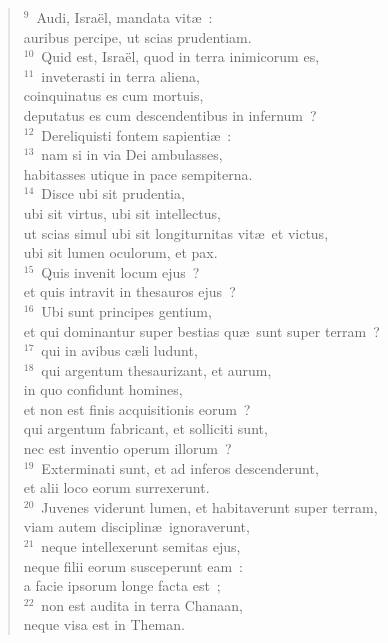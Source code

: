 \begin{verse}${}^{9}$~Audi, Isra\"el, mandata vit\ae~:\\ auribus percipe, ut scias prudentiam.\\
${}^{10}$~Quid est, Isra\"el, quod in terra inimicorum es,\\
${}^{11}$~inveterasti in terra aliena,\\ coinquinatus es cum mortuis,\\ deputatus es cum descendentibus in infernum~?\\
${}^{12}$~Dereliquisti fontem sapienti\ae~:\\
${}^{13}$~nam si in via Dei ambulasses,\\ habitasses utique in pace sempiterna.\\
${}^{14}$~Disce ubi sit prudentia,\\ ubi sit virtus, ubi sit intellectus,\\ ut scias simul ubi sit longiturnitas vit\ae\ et victus,\\ ubi sit lumen oculorum, et pax.\\
${}^{15}$~Quis invenit locum ejus~?\\ et quis intravit in thesauros ejus~?\\
${}^{16}$~Ubi sunt principes gentium,\\ et qui dominantur super bestias qu\ae\ sunt super terram~?\\
${}^{17}$~qui in avibus c\ae li ludunt,\\
${}^{18}$~qui argentum thesaurizant, et aurum,\\ in quo confidunt homines,\\ et non est finis acquisitionis eorum~?\\ qui argentum fabricant, et solliciti sunt,\\ nec est inventio operum illorum~?\\
${}^{19}$~Exterminati sunt, et ad inferos descenderunt,\\ et alii loco eorum surrexerunt.\\
${}^{20}$~Juvenes viderunt lumen, et habitaverunt super terram,\\ viam autem disciplin\ae\ ignoraverunt,\\
${}^{21}$~neque intellexerunt semitas ejus,\\ neque filii eorum susceperunt eam~:\\ a facie ipsorum longe facta est~;\\
${}^{22}$~non est audita in terra Chanaan,\\ neque visa est in Theman.\\

\end{verse}
